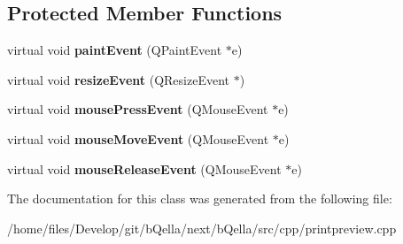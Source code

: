 \subsection*{Protected Member Functions}
\begin{DoxyCompactItemize}
\item 
\hypertarget{classPreviewView_addc37a5b6ecc8dcbd61f2f1f064585e8}{
virtual void {\bfseries paintEvent} (QPaintEvent $\ast$e)}
\label{classPreviewView_addc37a5b6ecc8dcbd61f2f1f064585e8}

\item 
\hypertarget{classPreviewView_afb08458c6edd29a61054b1f38cfafeb2}{
virtual void {\bfseries resizeEvent} (QResizeEvent $\ast$)}
\label{classPreviewView_afb08458c6edd29a61054b1f38cfafeb2}

\item 
\hypertarget{classPreviewView_a5b40b21ddb841b86fe940c6e8e1c3d72}{
virtual void {\bfseries mousePressEvent} (QMouseEvent $\ast$e)}
\label{classPreviewView_a5b40b21ddb841b86fe940c6e8e1c3d72}

\item 
\hypertarget{classPreviewView_ae5f620898cf4f29bcfb9fc50ea267271}{
virtual void {\bfseries mouseMoveEvent} (QMouseEvent $\ast$e)}
\label{classPreviewView_ae5f620898cf4f29bcfb9fc50ea267271}

\item 
\hypertarget{classPreviewView_a1c978917c8a5502bb17049776705ef19}{
virtual void {\bfseries mouseReleaseEvent} (QMouseEvent $\ast$e)}
\label{classPreviewView_a1c978917c8a5502bb17049776705ef19}

\end{DoxyCompactItemize}


The documentation for this class was generated from the following file:\begin{DoxyCompactItemize}
\item 
/home/files/Develop/git/bQella/next/bQella/src/cpp/printpreview.cpp\end{DoxyCompactItemize}
